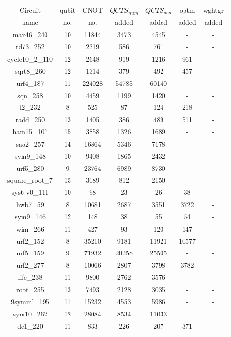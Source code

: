 \documentclass[runningheads]{llncs}
\begin{document}
		\begin{table}[H]
			\label{tab4}
			\begin{center}  
			\begin{tabular}{|c|c|c|c|c|c|c|}
			\hline
			Circuit &  qubit  & CNOT &$QCTS_{num}$& $QCTS_{dep}$  & optm 	 & wghtgr 	\\
			 name	&   no. 	&	no. & added&  added &  added 	&  added\\
			\hline
			max46\_240 & 10 & 11844 & 3473 & 4545 & - & - \\ 
rd73\_252 & 10 & 2319 & 586 & 761 & - & - \\ 
cycle10\_2\_110 & 12 & 2648 & 919 & 1216 & 961 & - \\ 
sqrt8\_260 & 12 & 1314 & 379 & 492 & 457 & - \\ 
urf4\_187 & 11 & 224028 & 54785 & 60140 & - & - \\ 
sqn\_258 & 10 & 4459 & 1199 & 1420 & - & - \\ 
f2\_232 & 8 & 525 & 87 & 124 & 218 & - \\ 
radd\_250 & 13 & 1405 & 386 & 489 & 511 & - \\ 
ham15\_107 & 15 & 3858 & 1326 & 1689 & - & - \\ 
sao2\_257 & 14 & 16864 & 5346 & 7178 & - & - \\ 
sym9\_148 & 10 & 9408 & 1865 & 2432 & - & - \\ 
urf5\_280 & 9 & 23764 & 6989 & 8730 & - & - \\ 
square\_root\_7 & 15 & 3089 & 812 & 2150 & - & - \\ 
sys6-v0\_111 & 10 & 98 & 23 & 26 & 38 & - \\ 
hwb7\_59 & 8 & 10681 & 2687 & 3551 & 3722 & - \\ 
sym9\_146 & 12 & 148 & 38 & 55 & 54 & - \\ 
wim\_266 & 11 & 427 & 93 & 120 & 147 & - \\ 
urf2\_152 & 8 & 35210 & 9181 & 11921 & 10577 & - \\ 
urf5\_159 & 9 & 71932 & 20258 & 25505 & - & - \\ 
urf2\_277 & 8 & 10066 & 2807 & 3798 & 3782 & - \\ 
life\_238 & 11 & 9800 & 2762 & 3576 & - & - \\ 
root\_255 & 13 & 7493 & 2128 & 3035 & - & - \\ 
9symml\_195 & 11 & 15232 & 4553 & 5986 & - & - \\ 
sym10\_262 & 12 & 28084 & 8534 & 11033 & - & - \\ 
dc1\_220 & 11 & 833 & 226 & 207 & 371 & - \\ 

\end{tabular}
\end{center}
\end{table}
\end{document}
